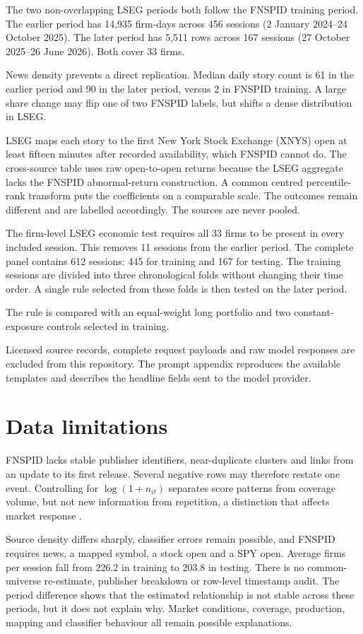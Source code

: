 The two non-overlapping LSEG periods both follow the FNSPID training period. The
earlier period has 14,935 firm-days across 456 sessions (2 January 2024--24
October 2025). The later period has 5,511 rows across 167 sessions (27 October
2025--26 June 2026). Both cover 33 firms.

News density prevents a direct replication. Median daily story count is 61 in
the earlier period and 90 in the later period, versus 2 in FNSPID training. A
large share change may flip one of two FNSPID labels, but shifts a dense
distribution in LSEG.

LSEG maps each story to the first New York Stock Exchange (XNYS) open at least
fifteen minutes after recorded availability, which FNSPID cannot do. The
cross-source table uses raw open-to-open returns because the LSEG aggregate lacks
the FNSPID abnormal-return construction. A common centred percentile-rank
transform puts the coefficients on a comparable scale. The outcomes remain
different and are labelled accordingly. The sources are never pooled.

The firm-level LSEG economic test requires all 33 firms to be present in every
included session. This removes 11 sessions from the earlier period. The complete
panel contains 612 sessions: 445 for training and 167 for testing. The training
sessions are divided into three chronological folds without changing their time
order. A single rule selected from these folds is then tested on the later
period.

The rule is compared with an equal-weight long portfolio and two
constant-exposure controls selected in training.

Licensed source records, complete request payloads and raw model responses are
excluded from this repository. The prompt appendix reproduces the available
templates and describes the headline fields sent to the model provider.

\section{Data limitations}

FNSPID lacks stable publisher identifiers, near-duplicate clusters and links
from an update to its first release. Several negative rows may therefore restate
one event. Controlling for
$\log(1+n_{it})$ separates score patterns from coverage volume, but not new
information from repetition, a distinction that affects market response
\citep{tetlock2011stale}.

Source density differs sharply, classifier errors remain possible, and FNSPID
requires news, a mapped symbol, a stock open and a SPY open. Average firms per
session fall from 226.2 in training to 203.8 in testing. There is no
common-universe re-estimate, publisher breakdown or row-level timestamp audit.
The period difference shows that the estimated relationship is not stable across
these periods, but it does not explain why. Market conditions, coverage,
production, mapping and classifier behaviour all remain possible explanations.
